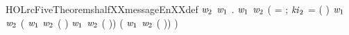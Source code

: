 \newcommand{\HOLrcFiveTheoremshalfXXmessageDeXXind}{\UseVerbatim{HOLrcFiveTheoremshalfXXmessageDeXXind}}
\begin{SaveVerbatim}{HOLrcFiveTheoremshalfXXmessageEnXXdef}
\HOLTokenTurnstile{} \HOLSymConst{\HOLTokenForall{}}\ensuremath{\HOLBoundVar{w}\sb{\mathrm{2}}} \ensuremath{\HOLBoundVar{w}\sb{\mathrm{1}}}  .
      \ensuremath{\HOLBoundVar{w}\sb{\mathrm{1}}} \ensuremath{\HOLBoundVar{w}\sb{\mathrm{2}}}   \HOLSymConst{=}
     (
         =   ;
        \ensuremath{\HOLBoundVar{ki}\sb{\mathrm{2}}} =  ( \HOLSymConst{\ensuremath{-}} ) 
          \HOLSymConst{=}   \ensuremath{\HOLBoundVar{w}\sb{\mathrm{1}}}
           \HOLSymConst{=}   \ensuremath{\HOLBoundVar{w}\sb{\mathrm{2}}}
          ( \ensuremath{\HOLBoundVar{w}\sb{\mathrm{1}}} \ensuremath{\HOLBoundVar{w}\sb{\mathrm{2}}}  ( \HOLSymConst{\ensuremath{-}} ) \HOLSymConst{\HOLTokenEor{}}
            \ensuremath{\HOLBoundVar{w}\sb{\mathrm{1}}} \ensuremath{\HOLBoundVar{w}\sb{\mathrm{2}}}  ( \HOLSymConst{\ensuremath{-}} )) \HOLSymConst{\HOLTokenRol{}}
           ( \ensuremath{\HOLBoundVar{w}\sb{\mathrm{1}}} \ensuremath{\HOLBoundVar{w}\sb{\mathrm{2}}}  ( \HOLSymConst{\ensuremath{-}} )) \HOLSymConst{\ensuremath{+}} )
\end{SaveVerbatim}
\newcommand{\HOLrcFiveTheoremshalfXXmessageEnXXdef}{\UseVerbatim{HOLrcFiveTheoremshalfXXmessageEnXXdef}}
